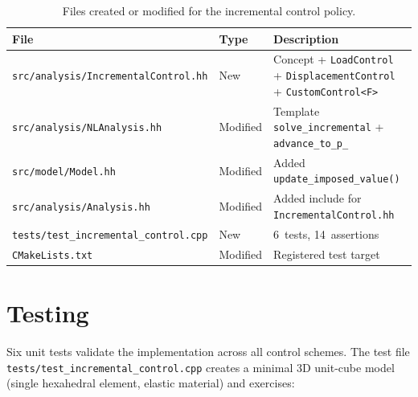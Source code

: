 \begin{table}[ht]
  \centering
  \caption{Files created or modified for the incremental control policy.}
  \label{tab:ic-files}
  \begin{tabular}{lll}
    \toprule
    File & Type & Description \\
    \midrule
    \texttt{src/analysis/IncrementalControl.hh}
      & New & Concept + \texttt{LoadControl} +
              \texttt{DisplacementControl} +
              \texttt{CustomControl<F>} \\
    \texttt{src/analysis/NLAnalysis.hh}
      & Modified & Template \texttt{solve\_incremental} +
                   \texttt{advance\_to\_p\_} \\
    \texttt{src/model/Model.hh}
      & Modified & Added \texttt{update\_imposed\_value()} \\
    \texttt{src/analysis/Analysis.hh}
      & Modified & Added include for \texttt{IncrementalControl.hh} \\
    \texttt{tests/test\_incremental\_control.cpp}
      & New & 6~tests, 14~assertions \\
    \texttt{CMakeLists.txt}
      & Modified & Registered test target \\
    \bottomrule
  \end{tabular}
\end{table}

\section{Testing}
\label{sec:ic-testing}

Six unit tests validate the implementation across all control schemes.
The test file \texttt{tests/test\_incremental\_control.cpp} creates a
minimal 3D unit-cube model (single hexahedral element, elastic material)
and exercises:


